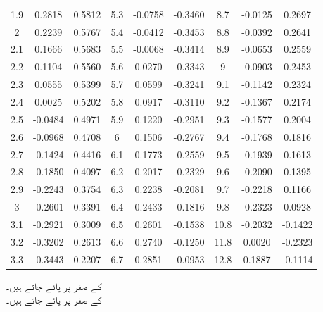 \begin{table}
\begin{otherlanguage}{english}
\begin{tabular}{|C|C|C||C|C|C||C|C|C|}
1.9 & 0.2818 & 0.5812 & 5.3 & -0.0758 & -0.3460 & 8.7 & -0.0125 & 0.2697 \\[1ex]
2 & 0.2239 & 0.5767 & 5.4 & -0.0412 & -0.3453 & 8.8 & -0.0392 & 0.2641 \\
2.1 & 0.1666 & 0.5683 & 5.5 & -0.0068 & -0.3414 & 8.9 & -0.0653 & 0.2559 \\
2.2 & 0.1104 & 0.5560 & 5.6 & 0.0270 & -0.3343 & 9 & -0.0903 & 0.2453 \\
2.3 & 0.0555 & 0.5399 & 5.7 & 0.0599 & -0.3241 & 9.1 & -0.1142 & 0.2324 \\
2.4 & 0.0025 & 0.5202 & 5.8 & 0.0917 & -0.3110 & 9.2 & -0.1367 & 0.2174 \\[1ex]
2.5 & -0.0484 & 0.4971 & 5.9 & 0.1220 & -0.2951 & 9.3 & -0.1577 & 0.2004 \\
2.6 & -0.0968 & 0.4708 & 6 & 0.1506 & -0.2767 & 9.4 & -0.1768 & 0.1816 \\
2.7 & -0.1424 & 0.4416 & 6.1 & 0.1773 & -0.2559 & 9.5 & -0.1939 & 0.1613 \\
2.8 & -0.1850 & 0.4097 & 6.2 & 0.2017 & -0.2329 & 9.6 & -0.2090 & 0.1395 \\
2.9 & -0.2243 & 0.3754 & 6.3 & 0.2238 & -0.2081 & 9.7 & -0.2218 & 0.1166 \\[1ex]
3 & -0.2601 & 0.3391 & 6.4 & 0.2433 & -0.1816 & 9.8 & -0.2323 & 0.0928 \\
3.1 & -0.2921 & 0.3009 & 6.5 & 0.2601 & -0.1538 & 10.8 & -0.2032 & -0.1422 \\
3.2 & -0.3202 & 0.2613 & 6.6 & 0.2740 & -0.1250 & 11.8 & 0.0020 & -0.2323 \\
3.3 & -0.3443 & 0.2207 & 6.7 & 0.2851 & -0.0953 & 12.8 & 0.1887 & -0.1114 \\
\hline
\end{tabular}
\end{otherlanguage}
\par\smallskip
{} کے صفر  پر پائے جاتے ہیں۔\\
 کے صفر  پر پائے جاتے ہیں۔
\end{table}
